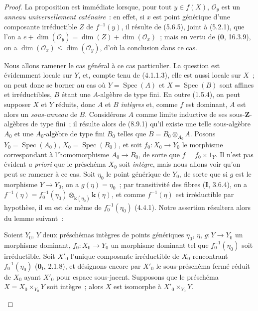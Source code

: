 \begin{proof}
La proposition est immédiate lorsque, pour tout $y\in f(X)$,
$\mathcal O_y$ est un \emph{anneau universellement caténaire}~: en effet, si
$x$ est point générique d'une composante irréductible $Z$ de $f^{-1}(y)$, il
résulte de (5.6.5), joint à (5.2.1), que l'on a
$e+\dim(\mathcal O_y)=\dim(Z)+\dim(\mathcal O_x)$~; mais en vertu de
($\mathbf 0$, 16.3.9), on a $\dim(\mathcal O_x)\leq\dim(\mathcal O_y)$,
d'où la conclusion dans ce cas.

Nous allons ramener le cas général à ce cas particulier. La question est
évidemment locale sur $Y$, et, compte tenu de (4.1.1.3), elle est aussi locale
sur $X$~; on peut donc se borner au cas où $Y=\operatorname{Spec}(A)$ et
$X=\operatorname{Spec}(B)$ sont affines et irréductibles, $B$ étant une
$A$-algèbre de type fini. En outre (1.5.4), on peut supposer $X$ et $Y$
réduits, donc $A$ et $B$ \emph{intègres} et, comme $f$ est dominant, $A$ est
alors un \emph{sous-anneau} de $B$. Considérons $A$ comme limite inductive de
ses sous-$\mathbf Z$-algèbres de type fini~; il résulte alors de (8.9.1) qu'il
existe une telle sous-algèbre $A_0$ et une $A_0$-algèbre de type fini $B_0$
telles que $B=B_0\otimes_{A_0}A$. Posons $Y_0=\operatorname{Spec}(A_0)$,
$X_0=\operatorname{Spec}(B_0)$, et soit $f_0:X_0\to Y_0$ le morphisme
correspondant à l'homomorphisme $A_0\to B_0$, de sorte que
$f=f_0\times 1_Y$. Il n'est pas évident \emph{a priori} que le préschéma $X_0$
soit \emph{intègre}, mais nous allons voir qu'on peut se ramener à ce cas. Soit
$\eta_0$ le point générique de $Y_0$, de sorte que si $g$ est le morphisme
$Y\to Y_0$, on a $g(\eta)=\eta_0$~; par transitivité des fibres
(\textbf{I}, 3.6.4), on a
$f^{-1}(\eta)=f_0^{-1}(\eta_0)\otimes_{\mathbf{k}(\eta_0)}\boldsymbol{k}(\eta)$, et comme
$f^{-1}(\eta)$ est irréductible par hypothèse, il en est de même de
$f_0^{-1}(\eta_0)$ (4.4.1). Notre assertion résultera alors du lemme suivant~:

\begin{lemma}[13.1.2]
\label{IV.13.1.2-fr}
Soient $Y_0$, $Y$ deux préschémas intègres de points génériques $\eta_0$,
$\eta$, $g:Y\to Y_0$ un morphisme dominant, $f_0:X_0\to Y_0$ un morphisme
dominant tel que $f_0^{-1}(\eta_0)$ soit irréductible. Soit $X'_0$ l'unique
composante irréductible de $X_0$ rencontrant $f_0^{-1}(\eta_0)$
\textup{($\mathbf 0_{\mathrm I}$, 2.1.8)}, et désignons encore par $X'_0$ le
sous-préschéma fermé réduit de $X_0$ ayant $X'_0$ pour espace sous-jacent.
Supposons que le préschéma $X=X_0\times_{Y_0}Y$ soit intègre~; alors $X$ est
isomorphe à $X'_0\times_{Y_0}Y$.
\end{lemma}


\end{proof}

